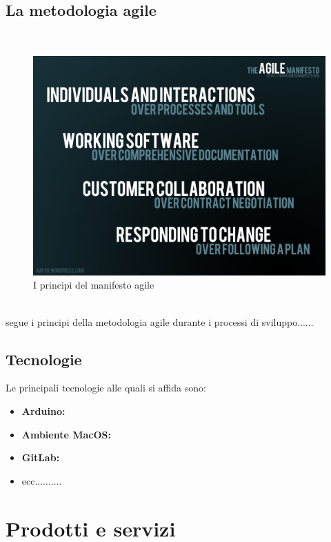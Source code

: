 \subsection{La metodologia agile}
\\
\begin{figure}[H]
	\begin{center}
	\includegraphics[scale=0.25]{immagini/agile_manifesto.jpg}
	\caption{I principi del manifesto agile}
	\end{center}
\end{figure}
\\
\lab{} segue i principi della metodologia agile durante i processi di sviluppo......


\subsection{Tecnologie}
Le principali tecnologie alle quali \lab{} si affida sono:
\begin{itemize}
\item \textbf{Arduino:}
\item \textbf{Ambiente MacOS:}
\item \textbf{GitLab:}
\item ecc..........
\end{itemize}



\newpage
\section{Prodotti e servizi}
